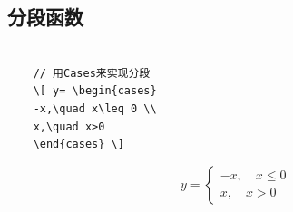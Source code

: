 \documentclass[UTF8]{book}
\begin{document}
{	\subsection{分段函数}
	\begin{lstlisting}
	
	// 用Cases来实现分段
	\[ y= \begin{cases}
	-x,\quad x\leq 0 \\
	x,\quad x>0
	\end{cases} \]

	\end{lstlisting}
	\[ y= \begin{cases}
	-x,\quad x\leq 0 \\
	x,\quad x>0
	\end{cases} \]

}
\vspace*{4em}
\end{document}

